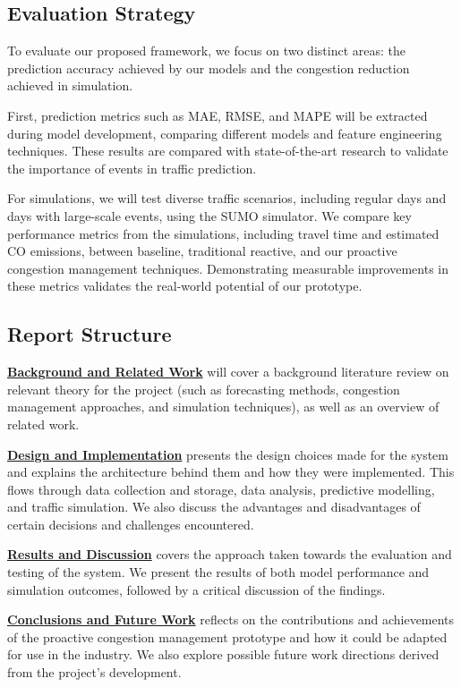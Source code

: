 \subsection{Evaluation Strategy}
To evaluate our proposed framework, we focus on two distinct areas: the prediction accuracy achieved by our models and the congestion reduction achieved in simulation.

First, prediction metrics such as MAE, RMSE, and MAPE will be extracted during model development, comparing different models and feature engineering techniques. These results are compared with state-of-the-art research to validate the importance of events in traffic prediction.

For simulations, we will test diverse traffic scenarios, including regular days and days with large-scale events, using the SUMO simulator. We compare key performance metrics from the simulations, including travel time and estimated CO emissions, between baseline, traditional reactive, and our proactive congestion management techniques. Demonstrating measurable improvements in these metrics validates the real-world potential of our prototype.

\subsection{Report Structure}
\textbf{\hyperref[sec:background]{Background and Related Work}} will cover a background literature review on relevant theory for the project (such as forecasting methods, congestion management approaches, and simulation techniques), as well as an overview of related work.

\textbf{\hyperref[sec:design-implementation]{Design and Implementation}} presents the design choices made for the system and explains the architecture behind them and how they were implemented. This flows through data collection and storage, data analysis, predictive modelling, and traffic simulation. We also discuss the advantages and disadvantages of certain decisions and challenges encountered.

\textbf{\hyperref[sec:results-discussions]{Results and Discussion}} covers the approach taken towards the evaluation and testing of the system. We present the results of both model performance and simulation outcomes, followed by a critical discussion of the findings.

\textbf{\hyperref[sec:conclusions-future]{Conclusions and Future Work}} reflects on the contributions and achievements of the proactive congestion management prototype and how it could be adapted for use in the industry. We also explore possible future work directions derived from the project’s development.


